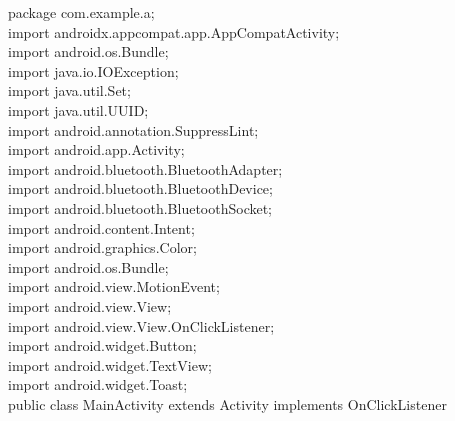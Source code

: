 \documentclass[12pt,a4paper]{report}
\begin{document}
{package com.example.a;\\
import androidx.appcompat.app.AppCompatActivity;\\
import android.os.Bundle;\\
import java.io.IOException;\\
import java.util.Set;\\
import java.util.UUID;\\
import android.annotation.SuppressLint;\\
import android.app.Activity;\\
import android.bluetooth.BluetoothAdapter;\\
import android.bluetooth.BluetoothDevice;\\
import android.bluetooth.BluetoothSocket;\\
import android.content.Intent;\\
import android.graphics.Color;\\
import android.os.Bundle;\\
import android.view.MotionEvent;\\
import android.view.View;\\
import android.view.View.OnClickListener;\\
import android.widget.Button;\\
import android.widget.TextView;\\
import android.widget.Toast;\\
public class MainActivity extends Activity implements OnClickListener {

}}
\end{document}
